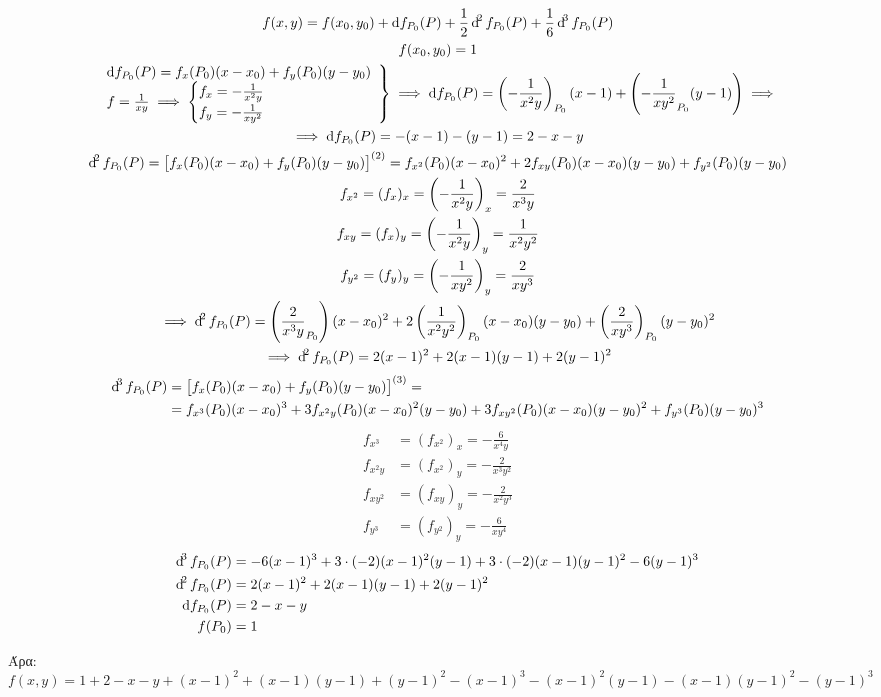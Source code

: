 \documentclass[11pt,a4paper,titlepage,draft]{article}
\begin{document}
\begin{gather*}
f(x,y) = f(x_0,y_0) + \dif f_{P_0}(P) + \frac{1}{2}\dif^2 f_{P_0}(P) + \frac{1}{6} \dif^3 f_{P_0}(P) \\
f(x_0,y_0) = 1 \\ \left.
\begin{array}{l}
\dif f_{P_0}(P)=f_x(P_0)(x-x_0)+f_y(P_0)(y-y_0) \\
f=\frac{1}{xy} \implies \begin{cases}
f_x = -\frac{1}{x^2y} \\ f_y = -\frac{1}{xy^2}
\end{cases}
\end{array} \right\rbrace \implies
\dif f_{P_0}(P)= \left(-\frac{1}{x^2y} \right)_{P_0}(x-1) + \left(
-\frac{1}{xy^2}_{P_0}(y-1)
\right) \implies \\
\implies \dif f_{P_0}(P) = -(x-1)-(y-1) = 2-x-y\\
\dif^2f_{P_0}(P) = \left[
f_x(P_0)(x-x_0)+f_y(P_0)(y-y_0)
\right]^{(2)} =
f_{x^2}(P_0)(x-x_0)^2+2f_{xy}(P_0)(x-x_0)(y-y_0)+f_{y^2}(P_0)(y-y_0) \\
f_{x^2} = (f_x)_x = \left(-\frac{1}{x^2y} \right)_x = \frac{2}{x^3y} \\
f_{xy} = (f_x)_y = \left(-\frac{1}{x^2y} \right)_y = \frac{1}{x^2y^2} \\
f_{y^2} = (f_y)_y = \left(-\frac{1}{xy^2} \right)_y = \frac{2}{xy^3} \\
\implies \dif^2 f_{P_0}(P) = \left(
\frac{2}{x^3y}_{P_0}\right)(x-x_0)^2+2\left(
\frac{1}{x^2y^2}\right)_{P_0}(x-x_0)(y-y_0)+\left(
\frac{2}{xy^3}
\right)_{P_0}(y-y_0)^2 \\
\implies \dif^2 f_{P_0}(P) = 2(x-1)^2+2(x-1)(y-1)+2(y-1)^2
\end{gather*}
\begin{align*}
\dif^3 f_{P_0}(P) &= \left[
f_x(P_0)(x-x_0)+f_y(P_0)(y-y_0)
\right]^{(3)} = \\
&= f_{x^3}(P_0)(x-x_0)^3+3f_{x^2y}(P_0)(x-x_0)^2(y-y_0)+3f_{xy^2}(P_0)(x-x_0)(y-y_0)^2 + f_{y^3}(P_0)(y-y_0)^3
\end{align*}
\begin{align*}
f_{x^3} &= (f_{x^2})_x = -\frac{6}{x^4y}\\
f_{x^2y} &= (f_{x^2})_y = -\frac{2}{x^3y^2}\\
f_{xy^2} &= (f_{xy})_y = -\frac{2}{x^2y^3}\\
f_{y^3} &= (f_{y^2})_y = -\frac{6}{xy^4}
\end{align*}
\begin{align*}
\dif^3 f_{P_0}(P) &= -6(x-1)^3+3\cdot(-2)(x-1)^2(y-1) + 3\cdot(-2)(x-1)(y-1)^2-6(y-1)^3\\
\dif^2 f_{P_0}(P) &= 2(x-1)^2+2(x-1)(y-1)+2(y-1)^2 \\
\dif f_{P_0}(P)   &= 2-x-y \\
f(P_0) &= 1
\end{align*}

Άρα:
\[
f(x,y) = 1+2-x-y+(x-1)^2+(x-1)(y-1)+(y-1)^2-(x-1)^3-(x-1)^2(y-1)-(x-1)(y-1)^2-(y-1)^3
\]
\end{document}
